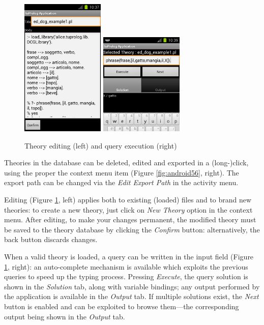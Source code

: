 \begin{figure}
\centering
  \includegraphics[width=150px]{images/android7.png}
  \includegraphics[width=150px]{images/android8.png}
  \caption{Theory editing (left) and query execution (right)}\label{fig:android78}
\end{figure}

Theories in the database can be deleted, edited and exported in a (long-)click, using the proper the context menu item (Figure \ref{fig:android56}, right). The export path can be changed via the \textit{Edit Export Path} in the activity menu.

Editing (Figure \ref{fig:android78}, left) applies both to existing (loaded) files and to brand new theories: to create a new theory, just click on \textit{New Theory} option in the context menu.
%
After editing, to make your changes permanent, the modified theory must be saved to the theory database by clicking the \textit{Confirm} button: alternatively, the back button discards changes.

When a valid theory is loaded, a query can be written in the input field (Figure \ref{fig:android78}, right): an auto-complete mechanism is available which exploits the previous queries to speed up the typing process.
%
Pressing \textit{Execute}, the query solution is shown in the \textit{Solution} tab, along with variable bindings; any output performed by the application is available in the \textit{Output} tab. If multiple solutions exist, the \textit{Next} button is enabled and can be exploited to browse them---the corresponding output being shown in the \textit{Output} tab.

